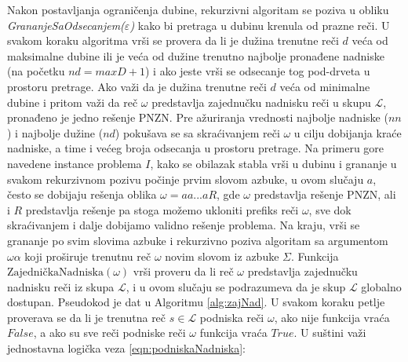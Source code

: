 \documentclass[12pt,oneside]{memoir}
\begin{document}
Nakon postavljanja ograničenja dubine, rekurzivni algoritam se poziva
u obliku \textit{GrananjeSaOdsecanjem($\varepsilon$)} kako bi pretraga u dubinu krenula od prazne reči.
U svakom koraku algoritma vrši se provera da li je dužina trenutne reči $d$ veća od maksimalne dubine ili je veća od
dužine trenutno najbolje pronađene nadniske (na početku $nd=maxD + 1$) i ako jeste vrši se odsecanje tog pod-drveta u prostoru
pretrage. Ako važi da je dužina trenutne reči $d$ veća od minimalne dubine i pritom važi da reč
$\omega$ predstavlja zajednučku nadnisku reči u skupu $\mathcal{L}$, pronađeno je jedno rešenje PNZN.
Pre ažuriranja vrednosti najbolje nadniske ($nn$) i najbolje dužine ($nd$) pokušava se sa skraćivanjem
reči $\omega$ u cilju dobijanja kraće nadniske, a time i većeg broja odsecanja u prostoru pretrage.
Na primeru gore navedene instance problema $I$, kako se obilazak stabla vrši u dubinu i grananje u svakom
rekurzivnom pozivu počinje prvim slovom azbuke, u ovom slučaju $a$, često se dobijaju rešenja
oblika $\omega=aa...aR$, gde $\omega$ predstavlja rešenje PNZN, ali i $R$ predstavlja rešenje pa stoga
možemo ukloniti prefiks reči $\omega$, sve dok skraćivanjem i dalje dobijamo validno rešenje problema.
Na kraju, vrši se grananje po svim slovima azbuke i rekurzivno poziva algoritam sa argumentom $\omega\alpha$
koji proširuje trenutnu reč $\omega$ novim slovom iz azbuke $\Sigma$. Funkcija $\textrm{ZajedničkaNadniska}(\omega)$ vrši proveru
da li reč $\omega$ predstavlja zajednučku nadnisku reči iz skupa $\mathcal{L}$, i u ovom slučaju se podrazumeva
da je skup $\mathcal{L}$ globalno dostupan. Pseudokod je dat u Algoritmu \ref{alg:zajNad}. 
U svakom koraku petlje proverava se da li je trenutna reč $s\in\mathcal{L}$ podniska reči $\omega$,
ako nije funkcija vraća $False$, a ako su sve reči podniske reči $\omega$ funkcija vraća $True$.
U suštini važi jednostavna logička veza \ref{eqn:podniskaNadniska}:
\end{document}

